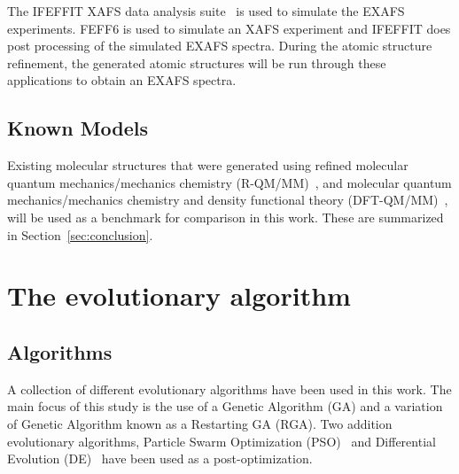 \documentclass[conference]{IEEEtran}
\begin{document}
The IFEFFIT XAFS data analysis suite~\cite{ifeffit} is used to simulate the EXAFS experiments. FEFF6 is used to simulate an XAFS experiment and IFEFFIT does post processing of the simulated EXAFS spectra. During the atomic structure refinement, the generated atomic structures will be run through these applications to obtain an EXAFS spectra.

\subsection{Known Models}

Existing molecular structures that were generated using refined molecular quantum mechanics/mechanics chemistry (R-QM/MM)~\cite{luber2011s1}, and molecular quantum mechanics/mechanics chemistry and density functional theory (DFT-QM/MM)~\cite{luber2011s1}, will be used as a benchmark for comparison in this work. These are summarized in Section~\ref{sec:conclusion}.


\section{The evolutionary algorithm}
\label{sec:evolutionaryAlgorithm}

\subsection{Algorithms}

A collection of different evolutionary algorithms have been used in this work. The main focus of this study is the use of a Genetic Algorithm (GA) and a variation of Genetic Algorithm known as a Restarting GA (RGA). Two addition evolutionary algorithms, Particle Swarm Optimization (PSO)~\cite{kennedy2010particle} and Differential Evolution (DE)~\cite{storn1997differential} have been used as a post-optimization.
\end{document}
